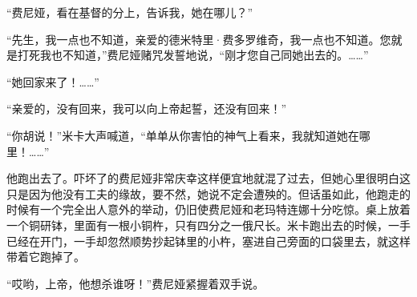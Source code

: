\par “费尼娅，看在基督的分上，告诉我，她在哪儿？”
\par “先生，我一点也不知道，亲爱的德米特里·费多罗维奇，我一点也不知道。您就是打死我也不知道，”费尼娅赌咒发誓地说，“刚才您自己同她出去的。……”
\par “她回家来了！……”
\par “亲爱的，没有回来，我可以向上帝起誓，还没有回来！”
\par “你胡说！”米卡大声喊道，“单单从你害怕的神气上看来，我就知道她在哪里！……”
\par 他跑出去了。吓坏了的费尼娅非常庆幸这样便宜地就混了过去，但她心里很明白这只是因为他没有工夫的缘故，要不然，她说不定会遭殃的。但话虽如此，他跑走的时候有一个完全出人意外的举动，仍旧使费尼娅和老玛特连娜十分吃惊。桌上放着一个铜研钵，里面有一根小铜杵，只有四分之一俄尺长。米卡跑出去的时候，一手已经在开门，一手却忽然顺势抄起钵里的小杵，塞进自己旁面的口袋里去，就这样带着它跑掉了。
\par “哎哟，上帝，他想杀谁呀！”费尼娅紧握着双手说。

